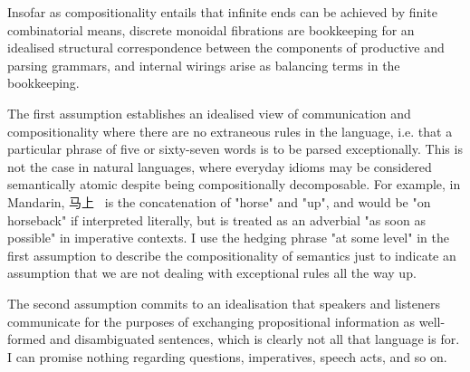 Insofar as compositionality entails that infinite ends can be achieved by finite combinatorial means, discrete monoidal fibrations are bookkeeping for an idealised structural correspondence between the components of productive and parsing grammars, and internal wirings arise as balancing terms in the bookkeeping.\\

\begin{CJK*}{UTF8}{gbsn}
The first assumption establishes an idealised view of communication and compositionality where there are no extraneous rules in the language, i.e. that a particular phrase of five or sixty-seven words is to be parsed exceptionally. This is not the case in natural languages, where everyday idioms may be considered semantically atomic despite being compositionally decomposable. For example, in Mandarin, 马上 \ is the concatenation of "horse" and "up", and would be "on horseback" if interpreted literally, but is treated as an adverbial "as soon as possible" in imperative contexts. I use the hedging phrase "at some level" in the first assumption to describe the compositionality of semantics just to indicate an assumption that we are not dealing with exceptional rules all the way up.\\
\end{CJK*}

The second assumption commits to an idealisation that speakers and listeners communicate for the purposes of exchanging propositional information as well-formed and disambiguated sentences, which is clearly not all that language is for. I can promise nothing regarding questions, imperatives, speech acts, and so on.\\

